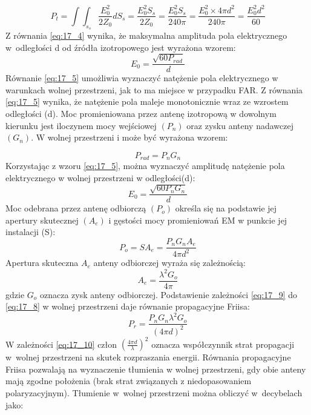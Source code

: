 \begin{equation} \label{eq:17_4}
    P_{t}=\int\int_{s_{s}}\frac{E^{2}_{0}}{2Z_{0}}dS_{s}=\frac{E^{2}_{0}S_{s}}{2Z_{0}}=\frac{E^{2}_{0}S_{s}}{240\pi}=\frac{E^{2}_{0} \times 4\pi d^{2}}{240\pi}=\frac{E^{2}_{0}d^{2}}{60}
\end{equation}
Z równania \eqref{eq:17_4} wynika, że maksymalna amplituda pola elektrycznego w~odległości d od źródła izotropowego jest wyrażona wzorem:
\begin{equation} \label{eq:17_5}
    E_{0}=\frac{\sqrt{60 P_{rad}}}{d}
\end{equation}
Równanie \eqref{eq:17_5} umożliwia wyznaczyć natężenie pola elektrycznego w warunkach wolnej przestrzeni, jak to ma miejsce w przypadku FAR. Z równania \eqref{eq:17_5} wynika, że natężenie pola maleje monotonicznie wraz ze wzrostem odległości (d).
Moc promieniowana przez antenę izotropową w dowolnym kierunku jest iloczynem mocy wejściowej $(P_n)$ oraz zysku anteny nadawczej $(G_n)$. W wolnej przestrzeni i może być wyrażona wzorem: 

\begin{equation} \label{eq:17_6}
    P_{rad}=P_{n}G_{n}
\end{equation}
Korzystając z wzoru \eqref{eq:17_5}, można wyznaczyć amplitudę natężenie pola elektrycznego w wolnej przestrzeni w odległości(d):
\begin{equation} \label{eq:17_7}
    E_{0}=\frac{\sqrt{60 P_{n}G_{n}}}{d}
\end{equation}
Moc odebrana przez antenę odbiorczą $(P_o)$ określa się na podstawie jej apertury skutecznej $(A_e)$ i gęstości mocy promieniowań EM w punkcie jej instalacji (S):
\begin{equation} \label{eq:17_8}
    P_{o}=SA_{e}=\frac{P_{n}G_{n}A_e}{4\pi d^{2}}
\end{equation}
Apertura skuteczna   $A_e$  anteny odbiorczej wyraża się zależnością:
\begin{equation} \label{eq:17_9}
    A_{e}=\frac{\lambda^{2}G_{o}}{4\pi}
\end{equation}
gdzie $G_o$ oznacza zysk anteny odbiorczej. Podstawienie zależności \eqref{eq:17_9} do \eqref{eq:17_8} w wolnej przestrzeni daje równanie propagacyjne Friisa:
\begin{equation} \label{eq:17_10}
    P_{r}=\frac{P_{n}G_{n}\lambda^{2}G_{o}}{(4\pi d)^{2}}
\end{equation}
W zależności \eqref{eq:17_10} człon $(\frac{4 \pi d}{\lambda})^{2}$ oznacza współczynnik strat propagacji w~wolnej przestrzeni na skutek rozpraszania energii. Równania propagacyjne Friisa pozwalają na wyznaczenie tłumienia w wolnej przestrzeni, gdy obie anteny mają zgodne położenia (brak strat związanych z niedopasowaniem polaryzacyjnym). Tłumienie w~wolnej przestrzeni można obliczyć w~decybelach jako:

